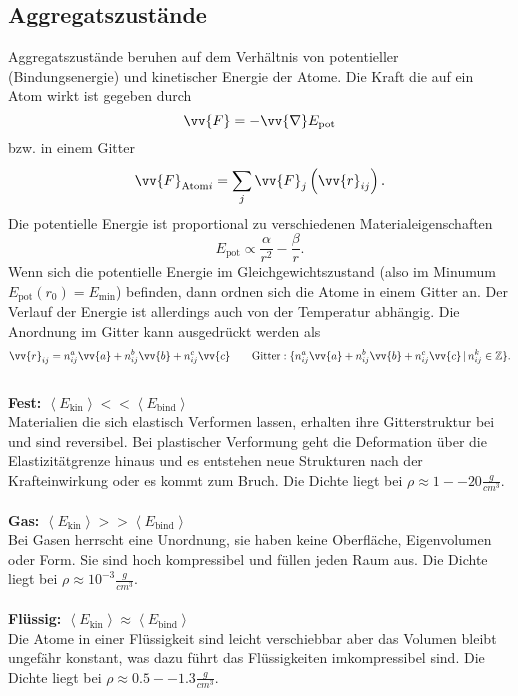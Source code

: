 \documentclass[a4paper,12pt]{article}
\numberwithin{equation}{section}
\begin{document}
\subsection{Aggregatszustände}
Aggregatszustände beruhen auf dem Verhältnis von potentieller (Bindungsenergie) und kinetischer Energie der Atome. Die Kraft die auf ein Atom wirkt ist gegeben durch 
\[ 
        \vv{F}=-\vv{\nabla}E_{\text{pot}}
\] 
bzw. in einem Gitter
\[ 
        \vv{F}_{\text{Atom}i}=\sum_{j}^{}\vv{F}_j\left(\vv{r}_{ij}\right)
.\] 
Die potentielle Energie ist proportional zu verschiedenen Materialeigenschaften
\[ 
        E_{\text{pot}}\propto \dfrac{\alpha }{r^2}-\dfrac{\beta }{r}
.\] 
Wenn sich die potentielle Energie im Gleichgewichtszustand (also im Minumum $E_{\text{pot}}\left(r_0\right)=E_{\text{min}}$) befinden, dann ordnen sich die Atome in einem Gitter an. Der Verlauf der Energie ist allerdings auch von der Temperatur abhängig. Die Anordnung im Gitter kann ausgedrückt werden als
\[ 
        \vv{r}_{ij}=n _{ij}^a\vv{a}+n _{ij}^b\vv{b}+n _{ij}^c\vv{c}\qquad \text{Gitter}:\{n _{ij}^a\vv{a}+n _{ij}^b\vv{b}+n _{ij}^c\vv{c}\,|\, n _{ij}^k \in \mathbb{Z}\}
.\] 
\hfill\\\textbf{Fest: $\left\langle E_{\text{kin}}\right\rangle <<\left\langle E_{\text{bind}}\right\rangle $}\\ 
Materialien die sich elastisch Verformen lassen, erhalten ihre Gitterstruktur bei und sind reversibel. Bei plastischer Verformung geht die Deformation über die Elastizitätgrenze hinaus und es entstehen neue Strukturen nach der Krafteinwirkung oder es kommt zum Bruch. Die Dichte liegt bei $\rho \approx 1--20\tfrac{g}{cm^3}$. 
\\\hfill\\\textbf{Gas: $\left\langle E_{\text{kin}}\right\rangle >>\left\langle E_{\text{bind}}\right\rangle $}\\ 
Bei Gasen herrscht eine Unordnung, sie haben keine Oberfläche, Eigenvolumen oder Form. Sie sind hoch kompressibel und füllen jeden Raum aus. Die Dichte liegt bei $\rho \approx 10^{-3}\tfrac{g}{cm^3}$.
\\\hfill\\\textbf{Flüssig: $\left\langle E_{\text{kin}}\right\rangle \approx \left\langle E_{\text{bind}}\right\rangle $}\\ 
Die Atome in einer Flüssigkeit sind leicht verschiebbar aber das Volumen bleibt ungefähr konstant, was dazu führt das Flüssigkeiten imkompressibel sind. Die Dichte liegt bei $\rho \approx 0.5--1.3 \tfrac{g}{cm^3}$.
\end{document}
